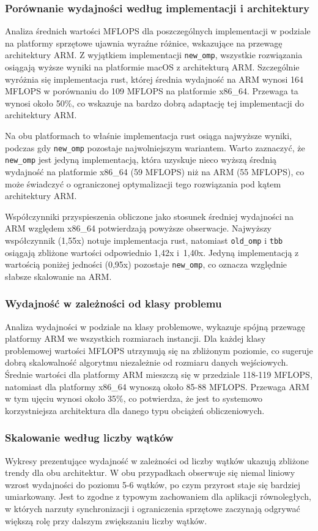\subsubsection{Porównanie wydajności według implementacji i architektury}
Analiza średnich wartości MFLOPS dla poszczególnych implementacji w podziale na platformy sprzętowe ujawnia wyraźne różnice, wskazujące na przewagę architektury ARM. Z wyjątkiem implementacji \texttt{new\_omp}, wszystkie rozwiązania osiągają wyższe wyniki na platformie macOS z architekturą ARM. Szczególnie wyróżnia się implementacja rust, której średnia wydajność na ARM wynosi 164 MFLOPS w porównaniu do 109 MFLOPS na platformie x86\_64. Przewaga ta wynosi około 50\%, co wskazuje na bardzo dobrą adaptację tej implementacji do architektury ARM.

Na obu platformach to właśnie implementacja rust osiąga najwyższe wyniki, podczas gdy \texttt{new\_omp} pozostaje najwolniejszym wariantem. Warto zaznaczyć, że \texttt{new\_omp} jest jedyną implementacją, która uzyskuje nieco wyższą średnią wydajność na platformie x86\_64 (59 MFLOPS) niż na ARM (55 MFLOPS), co może świadczyć o ograniczonej optymalizacji tego rozwiązania pod kątem architektury ARM.

Współczynniki przyspieszenia obliczone jako stosunek średniej wydajności na ARM względem x86\_64 potwierdzają powyższe obserwacje. Najwyższy współczynnik (1,55x) notuje implementacja rust, natomiast \texttt{old\_omp} i \texttt{tbb} osiągają zbliżone wartości odpowiednio 1,42x i~1,40x. Jedyną implementacją z wartością poniżej jedności (0,95x) pozostaje \texttt{new\_omp}, co oznacza względnie słabsze skalowanie na ARM.

\subsubsection{Wydajność w zależności od klasy problemu}
Analiza wydajności w podziale na klasy problemowe, wykazuje spójną przewagę platformy ARM we wszystkich rozmiarach instancji. Dla każdej klasy problemowej wartości MFLOPS utrzymują się na zbliżonym poziomie, co sugeruje dobrą skalowalność algorytmu niezależnie od rozmiaru danych wejściowych. Średnie wartości dla platformy ARM mieszczą się w przedziale 118-119 MFLOPS, natomiast dla platformy x86\_64 wynoszą około 85-88 MFLOPS. Przewaga ARM w tym ujęciu wynosi około 35\%, co potwierdza, że jest to systemowo korzystniejsza architektura dla danego typu obciążeń obliczeniowych.


\subsubsection{Skalowanie według liczby wątków}
Wykresy prezentujące wydajność w zależności od liczby wątków ukazują zbliżone trendy dla obu architektur. W obu przypadkach obserwuje się niemal liniowy wzrost wydajności do poziomu 5-6 wątków, po czym przyrost staje się bardziej umiarkowany. Jest to zgodne z typowym zachowaniem dla aplikacji równoległych, w których narzuty synchronizacji i ograniczenia sprzętowe zaczynają odgrywać większą rolę przy dalszym zwiększaniu liczby wątków.

